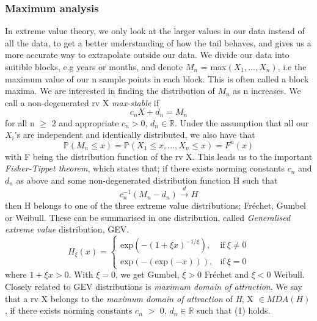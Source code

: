 \documentclass{article}
\begin{document}
	\subsubsection{Maximum analysis}
	In extreme value theory, we only look at the larger values in our data instead of all the data, to get a better understanding of how the tail behaves, and gives us a more accurate way to extrapolate outside our data. We divide our data into suitible blocks, e.g years or months, and denote $M_n$ = max$(X_1,...,X_n)$, i.e the maximum value of our n sample points in each block. This is often called a block maxima. We are interested in finding the distribution of $M_n$ as n increases. We call a non-degenerated rv X \textit{max-stable} if
	\begin{equation*}
	c_nX + d_n = M_n
	\end{equation*}
	for all n $\geq$ 2 and appropriate $c_n>0$, $d_n \in \mathbb{R}$. Under the assumption that all our $X_i$'s are independent and identically distributed, we also have that
	\begin{equation*}
	\mathbb{P}(M_n \leq x) = \mathbb{P}(X_1 \leq x,...,X_n \leq x) = F^n(x)
	\end{equation*}
	with F being the distribution function of the rv X. This leads us to the important \textit{Fisher-Tippet theorem}, which states that; if there exists norming constants $c_n$ and $d_n$ as above and some non-degenerated distribution function H such that
	\begin{equation}
	c_n^{-1}(M_n - d_n) \xrightarrow{d} H
	\end{equation}
	then H belongs to one of the three extreme value distributions; Fr\'{e}chet, Gumbel or Weibull. These can be summarised in one distribution, called \textit{Generalised extreme value} distribution, GEV. 
	\begin{equation*}
	H_\xi(x) = 
	\begin{cases}
	\text{exp}(-(1+\xi x)^{-1/\xi}), & \text{if} \ \xi \neq 0 \\
	\text{exp}(-(\text{exp}(-x))), & \text{if} \ \xi = 0 
	\end{cases}
	\end{equation*}
	where $1+\xi x > 0$. With $\xi = 0$, we get Gumbel, $\xi > 0$ Fr\'{e}chet and $\xi < 0$ Weibull. Closely related to GEV distributions is \textit{maximum domain of attraction}. We say that a rv X belongs to the \textit{maximum domain of attraction} of \textit{H}, X $\in MDA(H)$, if there exists norming constants $c_n$ $>$ 0, $d_n \in \mathbb{R}$ such that (1) holds.
\end{document}
